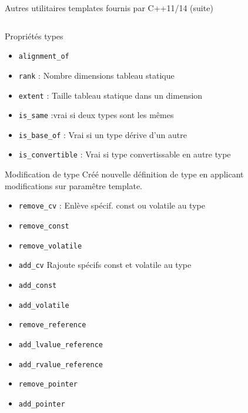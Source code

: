 \documentclass[handout,10pt]{beamer}
\begin{document}
\begin{frame}[fragile]{Autres utilitaires templates fournis par C++11/14 (suite)}
\tiny
\begin{columns}
\begin{column}{0.49\textwidth}
\begin{block}{Propriétés types}
\begin{itemize}
\item {\color{blue}\lstinline$alignment_of$}
\item {\color{blue}\lstinline$rank$} : Nombre dimensions tableau statique
\item {\color{blue}\lstinline$extent$} : Taille tableau statique dans un dimension
\item {\color{blue}\lstinline$is_same$}  :vrai si deux types sont les mêmes
\item {\color{blue}\lstinline$is_base_of$} : Vrai si un type dérive d'un autre
\item {\color{blue}\lstinline$is_convertible$} : Vrai si type convertissable en autre type
\end{itemize}
\end{block}
\begin{block}{Modification de type}
Créé nouvelle définition de type en applicant modifications sur paramêtre template.
\begin{itemize}
\item {\color{blue}\lstinline$remove_cv$} : Enlève spécif. const ou volatile au type
\item {\color{blue}\lstinline$remove_const$}
\item {\color{blue}\lstinline$remove_volatile$}
\item {\color{blue}\lstinline$add_cv$} Rajoute spécifs const et volatile au type
\item {\color{blue}\lstinline$add_const$}
\item {\color{blue}\lstinline$add_volatile$}
\item {\color{blue}\lstinline$remove_reference$}
\item {\color{blue}\lstinline$add_lvalue_reference$}
\item {\color{blue}\lstinline$add_rvalue_reference$}
\item {\color{blue}\lstinline$remove_pointer$}
\item {\color{blue}\lstinline$add_pointer$}
\end{itemize}
\end{block}
\end{column}
\begin{column}{0.49\textwidth}

\end{column}
\end{columns}
\end{frame}
\end{document}
